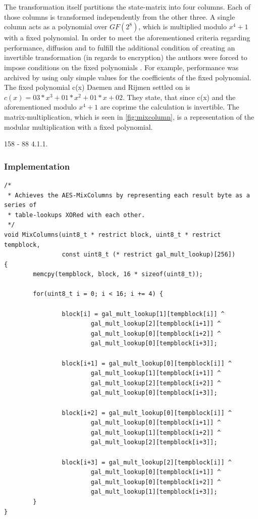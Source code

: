 The transformation itself partitions the
state-matrix into four columns. Each of those columns is transformed
independently from the other three. A single column acts as a polynomial
over $GF(2^{8})$, which is multiplied modulo $x^4 + 1$ with a fixed polynomial. In
order to meet the aforementioned criteria regarding performance,
diffusion and to fulfill the additional condition of creating an
invertible transformation (in regards to encryption) the authors were
forced to impose conditions on the fixed polynomials \cite[p. 39]{rijndael}. For
example, performance was archived by using only simple values for the
coefficients of the fixed polynomial. The fixed polynomial c(x) Daemen
and Rijmen settled on is $c(x) = 03 * x^3 + 01 * x^2 + 01 * x + 02$. They
state, that since c(x) and the aforementioned modulo $x^4+1$ are coprime
the calculation is invertible. The matrix-multiplication, which is seen
in \ref{fig:mixcolumn}, is a representation of the modular multiplication with a
fixed polynomial.

158 - 88 4.1.1.

\hypertarget{implementation-4}{%
\subsubsection{Implementation}\label{implementation-4}}

\begin{lstlisting}
/*
 * Achieves the AES-MixColumns by representing each result byte as a series of
 * table-lookups XORed with each other.
 */
void MixColumns(uint8_t * restrict block, uint8_t * restrict tempblock,
                const uint8_t (* restrict gal_mult_lookup)[256])
{
        memcpy(tempblock, block, 16 * sizeof(uint8_t));

        for(uint8_t i = 0; i < 16; i += 4) {

                block[i] = gal_mult_lookup[1][tempblock[i]] ^
                        gal_mult_lookup[2][tempblock[i+1]] ^
                        gal_mult_lookup[0][tempblock[i+2]] ^
                        gal_mult_lookup[0][tempblock[i+3]];

                block[i+1] = gal_mult_lookup[0][tempblock[i]] ^
                        gal_mult_lookup[1][tempblock[i+1]] ^
                        gal_mult_lookup[2][tempblock[i+2]] ^
                        gal_mult_lookup[0][tempblock[i+3]];

                block[i+2] = gal_mult_lookup[0][tempblock[i]] ^
                        gal_mult_lookup[0][tempblock[i+1]] ^
                        gal_mult_lookup[1][tempblock[i+2]] ^
                        gal_mult_lookup[2][tempblock[i+3]];

                block[i+3] = gal_mult_lookup[2][tempblock[i]] ^
                        gal_mult_lookup[0][tempblock[i+1]] ^
                        gal_mult_lookup[0][tempblock[i+2]] ^
                        gal_mult_lookup[1][tempblock[i+3]];
        }
}
\end{lstlisting}

